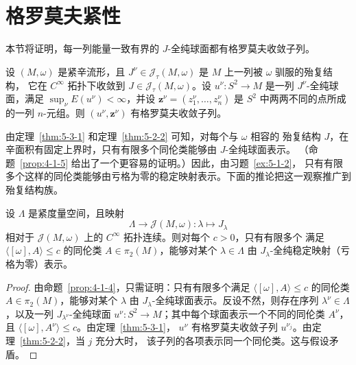 
\section{格罗莫夫紧性}\label{sec:5-3}

本节将证明，每一列能量一致有界的 $J$-全纯球面都有格罗莫夫收敛子列。

\begin{theorem}\label{thm:5-3-1}
设 $(M,\omega)$ 是紧辛流形，且
$J^\nu\in\mathcal J_\tau(M,\omega)$ 是 $M$ 上一列被 $\omega$ 驯服的殆复结构，
它在 $C^\infty$ 拓扑下收敛到 $J\in\mathcal J_\tau(M,\omega)$。设
$u^\nu:S^2\to M$ 是一列 $J^\nu$-全纯球面，满足
$\sup_\nu E(u^\nu)<\infty$，并设
$\mathbf z^\nu=(z_1^\nu,\ldots,z_n^\nu)$ 是 $S^2$ 中两两不同的点所成的一列
$n$-元组。则 $(u^\nu,\mathbf z^\nu)$ 有格罗莫夫收敛子列。
\end{theorem}

由定理~\ref{thm:5-3-1} 和定理~\ref{thm:5-2-2} 可知，对每个与 $\omega$ 相容的
殆复结构 $J$，在辛面积有固定上界时，只有有限多个同伦类能够由 $J$-全纯球面表示。
（命题~\ref{prop:4-1-5} 给出了一个更容易的证明。）因此，由习题~\ref{ex:5-1-2}，
只有有限多个这样的同伦类能够由亏格为零的稳定映射表示。下面的推论把这一观察推广到
殆复结构族。

\begin{corollary}\label{cor:5-3-2}
设 $\Lambda$ 是紧度量空间，且映射
\[
  \Lambda\longrightarrow\mathcal J(M,\omega):\lambda\longmapsto J_\lambda
\]
相对于 $\mathcal J(M,\omega)$ 上的 $C^\infty$ 拓扑连续。则对每个 $c>0$，只有有限多个
满足 $\langle[\omega],A\rangle\le c$ 的同伦类 $A\in\pi_2(M)$，能够对某个
$\lambda\in\Lambda$ 由 $J_\lambda$-全纯稳定映射（亏格为零）表示。
\end{corollary}

\begin{proof}
由命题~\ref{prop:4-1-4}，只需证明：只有有限多个满足
$\langle[\omega],A\rangle\le c$ 的同伦类 $A\in\pi_2(M)$，能够对某个 $\lambda$ 由
$J_\lambda$-全纯球面表示。反设不然，则存在序列 $\lambda^\nu\in\Lambda$，以及一列
$J_{\lambda^\nu}$-全纯球面 $u^\nu:S^2\to M$；其中每个球面表示一个不同的同伦类
$A^\nu$，且 $\langle[\omega],A^\nu\rangle\le c$。由定理~\ref{thm:5-3-1}，
$u^\nu$ 有格罗莫夫收敛子列 $u^{\nu_j}$。由定理~\ref{thm:5-2-2}，当 $j$ 充分大时，
该子列的各项表示同一个同伦类。这与假设矛盾。
\end{proof}

